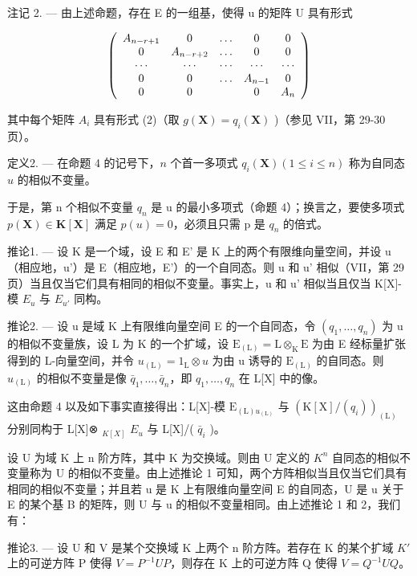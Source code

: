 注记 2. --- 由上述命题，存在 E 的一组基，使得 u 的矩阵 U 具有形式

\[
\left( \begin{array}{c c c c c} A _ {n - r + 1} & 0 & \dots & 0 & 0 \\ 0 & A _ {n - r + 2} & \dots & 0 & 0 \\ \cdots & \cdots & \cdots & \cdots & \cdots \\ 0 & 0 & \dots & A _ {n - 1} & 0 \\ 0 & 0 & & 0 & A _ {n} \end{array} \right)
\]

其中每个矩阵 \(A_{i}\) 具有形式 (2)（取 \(g(\mathbf{X}) = q_{i}(\mathbf{X})\) )（参见 VII，第 29-30 页）。

定义2. --- 在命题 4 的记号下，\(n\) 个首一多项式 \(q_{i}(\mathbf{X}) (1 \leqslant i \leqslant n)\) 称为自同态 \(u\) 的相似不变量。

于是，第 n 个相似不变量 \(q_{n}\) 是 u 的最小多项式（命题 4）；换言之，要使多项式 \(p(\mathbf{X}) \in \mathbf{K}[\mathbf{X}]\) 满足 \(p(u) = 0\)，必须且只需 p 是 \(q_{n}\) 的倍式。

推论1. --- 设 K 是一个域，设 E 和 E' 是 K 上的两个有限维向量空间，并设 u（相应地，u'）是 E（相应地，E'）的一个自同态。则 u 和 u' 相似（VII，第 29 页）当且仅当它们具有相同的相似不变量。事实上，u 和 u' 相似当且仅当 K{[}X{]}-模 \(E_{u}\) 与 \(E_{u'}\) 同构。

推论2. --- 设 u 是域 K 上有限维向量空间 E 的一个自同态，令 \((q_{1}, \ldots, q_{n})\) 为 u 的相似不变量族，设 L 为 K 的一个扩域，设 \(\mathrm{E}_{(\mathrm{L})} = \mathrm{L} \otimes_{\mathrm{K}} \mathrm{E}\) 为由 E 经标量扩张得到的 L-向量空间，并令 \(u_{(\mathrm{L})} = 1_{\mathrm{L}} \otimes u\) 为由 u 诱导的 \(\mathrm{E}_{(\mathrm{L})}\) 的自同态。则 \(u_{(\mathrm{L})}\) 的相似不变量是像 \(\bar{q}_{1}, \ldots, \bar{q}_{n}\)，即 \(q_{1}, \ldots, q_{n}\) 在 L{[}X{]} 中的像。

这由命题 4 以及如下事实直接得出：L{[}X{]}-模 \(\mathrm{E}_{(\mathrm{L})u_{(\mathrm{L})}}\) 与 \((\mathrm{K}[\mathrm{X}]/(q_{i}))_{(\mathrm{L})}\) 分别同构于 L{[}X{]}⊗ \(_{K[X]}\) \(E_{u}\) 与 L{[}X{]}/( \(\bar{q}_{i}\) )。

设 U 为域 K 上 n 阶方阵，其中 K 为交换域。则由 U 定义的 \(K^{n}\) 自同态的相似不变量称为 U 的相似不变量。由上述推论 1 可知，两个方阵相似当且仅当它们具有相同的相似不变量；并且若 u 是 K 上有限维向量空间 E 的自同态，U 是 u 关于 E 的某个基 B 的矩阵，则 U 与 u 的相似不变量相同。由上述推论 1 和 2，我们有：

推论3. --- 设 U 和 V 是某个交换域 K 上两个 n 阶方阵。若存在 K 的某个扩域 \(K'\) 上的可逆方阵 P 使得 \(V = P^{-1}UP\)，则存在 K 上的可逆方阵 Q 使得 \(V = Q^{-1}UQ\)。

